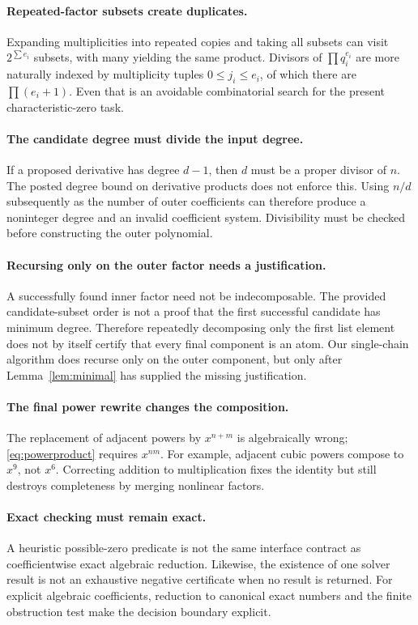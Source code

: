 \documentclass[11pt,a4paper]{article}
\numberwithin{equation}{section}
\theoremstyle{definition}
\theoremstyle{remark}
\begin{document}
\paragraph{Repeated-factor subsets create duplicates.}
Expanding multiplicities into repeated copies and taking all subsets can
visit $2^{\sum e_i}$ subsets, with many yielding the same product. Divisors
of $\prod q_i^{e_i}$ are more naturally indexed by multiplicity tuples
$0\le j_i\le e_i$, of which there are $\prod(e_i+1)$. Even that is an
avoidable combinatorial search for the present characteristic-zero task.

\paragraph{The candidate degree must divide the input degree.}
If a proposed derivative has degree $d-1$, then $d$ must be a proper divisor
of $n$. The posted degree bound on derivative products does not enforce this.
Using $n/d$ subsequently as the number of outer coefficients can therefore
produce a noninteger degree and an invalid coefficient system. Divisibility
must be checked before constructing the outer polynomial.

\paragraph{Recursing only on the outer factor needs a justification.}
A successfully found inner factor need not be indecomposable. The provided
candidate-subset order is not a proof that the first successful candidate has
minimum degree. Therefore repeatedly decomposing only the first list element
does not by itself certify that every final component is an atom. Our
single-chain algorithm does recurse only on the outer component, but only
after Lemma~\ref{lem:minimal} has supplied the missing justification.

\paragraph{The final power rewrite changes the composition.}
The replacement of adjacent powers by $x^{n+m}$ is algebraically wrong;
\eqref{eq:powerproduct} requires $x^{nm}$. For example, adjacent cubic powers
compose to $x^9$, not $x^6$. Correcting addition to multiplication fixes the
identity but still destroys completeness by merging nonlinear factors.

\paragraph{Exact checking must remain exact.}
A heuristic possible-zero predicate is not the same interface contract as
coefficientwise exact algebraic reduction. Likewise, the existence of one
solver result is not an exhaustive negative certificate when no result is
returned. For explicit algebraic coefficients, reduction to canonical exact
numbers and the finite obstruction test make the decision boundary explicit.
\end{document}
